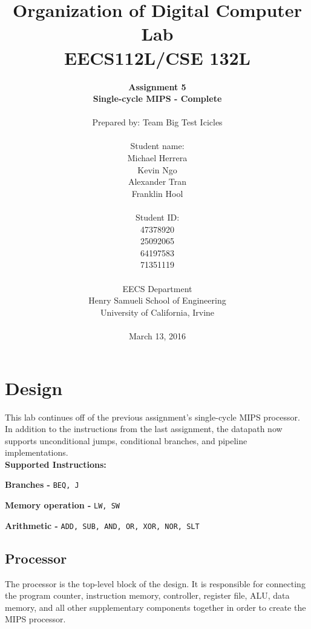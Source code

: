 \documentclass{article}
\begin{document}
\title{Organization of Digital Computer Lab \\ EECS112L/CSE 132L}
\author{\textbf{Assignment 5 }\\ \textbf{Single-cycle MIPS - Complete} \\ \\
Prepared by: Team Big Test Icicles \\ \\ Student name: \\ Michael Herrera \\ Kevin Ngo \\ Alexander Tran \\ Franklin Hool \\ \\ Student ID: \\ 47378920 \\ 25092065 \\ 64197583 \\ 71351119 \\ \\ 
EECS Department\\ Henry Samueli School of Engineering \\ University of California, Irvine \\ \\
{March 13, 2016}} 


\date{}
\maketitle


\section{Design}
 This lab continues off of the previous assignment's single-cycle MIPS processor. In addition to the instructions from the last assignment, the datapath now supports unconditional jumps, conditional branches, and pipeline implementations.  
\\

\textbf{Supported Instructions:}

\textbf{Branches - }\texttt{BEQ, J}

\textbf{Memory operation - }\texttt{LW, SW}

\textbf{Arithmetic - }\texttt{ADD, SUB, AND, OR, XOR, NOR, SLT}

	\subsection{Processor}
	The processor is the top-level block of the design. It is responsible for connecting the program counter, instruction memory, controller, register file, ALU, data memory, and all other supplementary components together in order to create the MIPS processor.  
	
\end{document}
